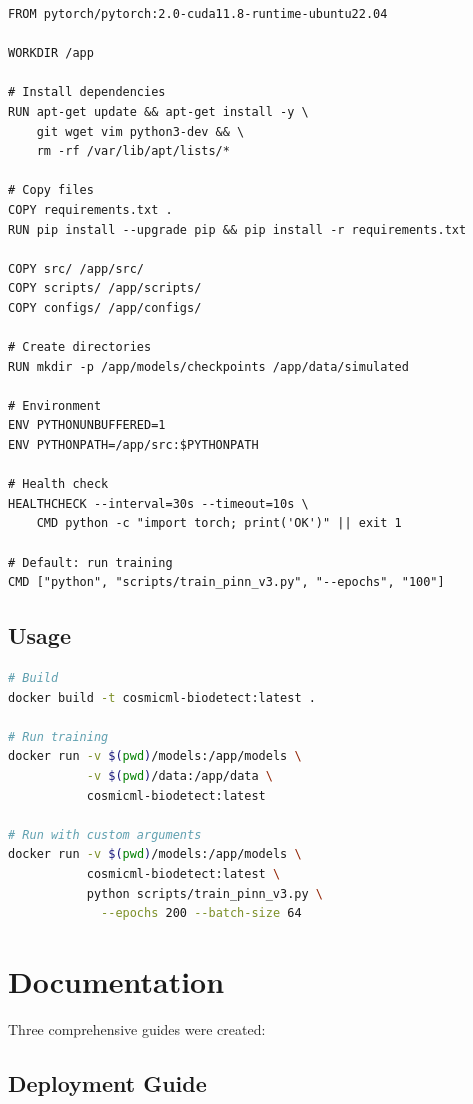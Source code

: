 \documentclass[12pt,a4paper,oneside]{report}
\begin{document}
\begin{lstlisting}
FROM pytorch/pytorch:2.0-cuda11.8-runtime-ubuntu22.04

WORKDIR /app

# Install dependencies
RUN apt-get update && apt-get install -y \
    git wget vim python3-dev && \
    rm -rf /var/lib/apt/lists/*

# Copy files
COPY requirements.txt .
RUN pip install --upgrade pip && pip install -r requirements.txt

COPY src/ /app/src/
COPY scripts/ /app/scripts/
COPY configs/ /app/configs/

# Create directories
RUN mkdir -p /app/models/checkpoints /app/data/simulated

# Environment
ENV PYTHONUNBUFFERED=1
ENV PYTHONPATH=/app/src:$PYTHONPATH

# Health check
HEALTHCHECK --interval=30s --timeout=10s \
    CMD python -c "import torch; print('OK')" || exit 1

# Default: run training
CMD ["python", "scripts/train_pinn_v3.py", "--epochs", "100"]
\end{lstlisting}

\subsection{Usage}

\begin{lstlisting}[language=bash]
# Build
docker build -t cosmicml-biodetect:latest .

# Run training
docker run -v $(pwd)/models:/app/models \
           -v $(pwd)/data:/app/data \
           cosmicml-biodetect:latest

# Run with custom arguments
docker run -v $(pwd)/models:/app/models \
           cosmicml-biodetect:latest \
           python scripts/train_pinn_v3.py \
             --epochs 200 --batch-size 64
\end{lstlisting}

\section{Documentation}

Three comprehensive guides were created:

\subsection{Deployment Guide}
\end{document}
